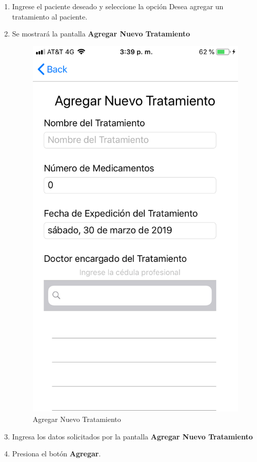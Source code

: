 \begin{enumerate}
	
	\item Ingrese el paciente deseado y seleccione la opción Desea agregar un tratamiento al paciente.
	
	\item Se mostrará la pantalla \textbf{Agregar Nuevo Tratamiento}
	\newpage
	\begin{figure}[!htbp]			
		\hypertarget{fig:AgregarTratamiento}{\hspace{1pt}}
		\begin{center}
			\includegraphics[height=0.4\textheight]{Paciente/AgregarTratamiento/images/AgregarTratamiento}
			\caption{Agregar Nuevo Tratamiento}
			\label{fig:AgregarTratamiento}
		\end{center}
	\end{figure}

	\item Ingresa los datos solicitados por la pantalla \textbf{Agregar Nuevo Tratamiento}
	
	\item Presiona el botón \textbf{Agregar}.

\end{enumerate}

